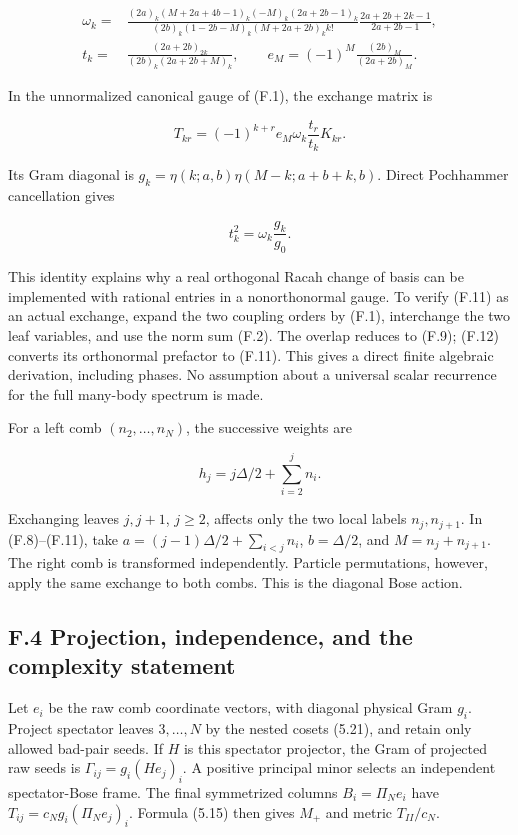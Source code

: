 \[
\begin{aligned}
\omega_k={}&\frac{(2a)_k(M+2a+4b-1)_k(-M)_k(2a+2b-1)_k}
{(2b)_k(1-2b-M)_k(M+2a+2b)_k k!}
\frac{2a+2b+2k-1}{2a+2b-1},\\
t_k={}&\frac{(2a+2b)_{2k}}{(2b)_k(2a+2b+M)_k},\qquad
e_M=(-1)^M\frac{(2b)_M}{(2a+2b)_M}.
\end{aligned}
\tag{F.10}
\]

In the unnormalized canonical gauge of (F.1), the exchange matrix is

\[
T_{kr}=(-1)^{k+r}e_M\omega_k\frac{t_r}{t_k}K_{kr}.
\tag{F.11}
\]

Its Gram diagonal is \(g_k=\eta(k;a,b)\eta(M-k;a+b+k,b)\). Direct Pochhammer cancellation gives

\[
t_k^2=\omega_k\frac{g_k}{g_0}.
\tag{F.12}
\]

This identity explains why a real orthogonal Racah change of basis can be implemented with rational entries in a nonorthonormal gauge. To verify (F.11) as an actual exchange, expand the two coupling orders by (F.1), interchange the two leaf variables, and use the norm sum (F.2). The overlap reduces to (F.9); (F.12) converts its orthonormal prefactor to (F.11). This gives a direct finite algebraic derivation, including phases. No assumption about a universal scalar recurrence for the full many-body spectrum is made.

For a left comb \((n_2,\ldots,n_N)\), the successive weights are

\[
h_j=j\Delta/2+\sum_{i=2}^j n_i.
\tag{F.13}
\]

Exchanging leaves \(j,j+1\), \(j\ge2\), affects only the two local labels \(n_j,n_{j+1}\). In (F.8)--(F.11), take \(a=(j-1)\Delta/2+\sum_{i<j}n_i\), \(b=\Delta/2\), and \(M=n_j+n_{j+1}\). The right comb is transformed independently. Particle permutations, however, apply the same exchange to both combs. This is the diagonal Bose action.

\hypertarget{f.4-projection-independence-and-the-complexity-statement}{%
\subsection{F.4 Projection, independence, and the complexity statement}\label{f.4-projection-independence-and-the-complexity-statement}}

Let \(e_i\) be the raw comb coordinate vectors, with diagonal physical Gram \(g_i\). Project spectator leaves \(3,\ldots,N\) by the nested cosets (5.21), and retain only allowed bad-pair seeds. If \(H\) is this spectator projector, the Gram of projected raw seeds is \(\Gamma_{ij}=g_i(He_j)_i\). A positive principal minor selects an independent spectator-Bose frame. The final symmetrized columns \(B_i=\Pi_Ne_i\) have \(T_{ij}=c_Ng_i(\Pi_Ne_j)_i\). Formula (5.15) then gives \(M_+\) and metric \(T_{II}/c_N\).

